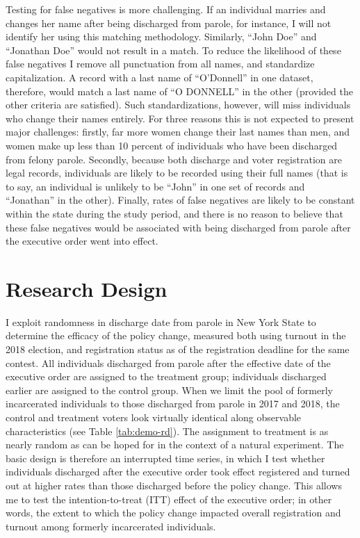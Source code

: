 \documentclass[
  12pt,
]{article}
\begin{document}
Testing for false negatives is more challenging. If an individual marries and changes her name after being discharged from parole, for instance, I will not identify her using this matching methodology. Similarly, ``John Doe'' and ``Jonathan Doe'' would not result in a match. To reduce the likelihood of these false negatives I remove all punctuation from all names, and standardize capitalization. A record with a last name of ``O'Donnell'' in one dataset, therefore, would match a last name of ``O DONNELL'' in the other (provided the other criteria are satisfied). Such standardizations, however, will miss individuals who change their names entirely. For three reasons this is not expected to present major challenges: firstly, far more women change their last names than men, and women make up less than 10 percent of individuals who have been discharged from felony parole. Secondly, because both discharge and voter registration are legal records, individuals are likely to be recorded using their full names (that is to say, an individual is unlikely to be ``John'' in one set of records and ``Jonathan'' in the other). Finally, rates of false negatives are likely to be constant within the state during the study period, and there is no reason to believe that these false negatives would be associated with being discharged from parole after the executive order went into effect.

\hypertarget{research-design}{%
\section*{Research Design}\label{research-design}}

I exploit randomness in discharge date from parole in New York State to determine the efficacy of the policy change, measured both using turnout in the 2018 election, and registration status as of the registration deadline for the same contest. All individuals discharged from parole after the effective date of the executive order are assigned to the treatment group; individuals discharged earlier are assigned to the control group. When we limit the pool of formerly incarcerated individuals to those discharged from parole in 2017 and 2018, the control and treatment voters look virtually identical along observable characteristics (see Table \ref{tab:demo-rd}). The assignment to treatment is as nearly random as can be hoped for in the context of a natural experiment. The basic design is therefore an interrupted time series, in which I test whether individuals discharged after the executive order took effect registered and turned out at higher rates than those discharged before the policy change. This allows me to test the intention-to-treat (ITT) effect of the executive order; in other words, the extent to which the policy change impacted overall registration and turnout among formerly incarcerated individuals.
\end{document}

